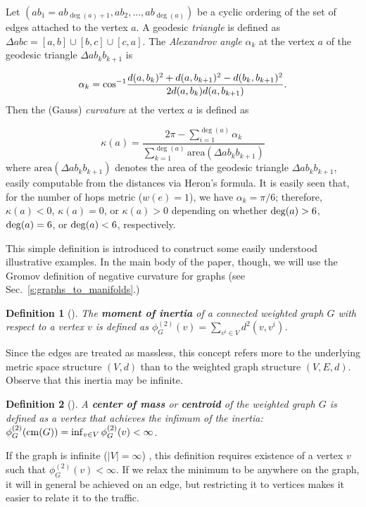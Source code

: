 \documentclass{article}
\newcommand{\area}{\mathrm{area}}
\newtheorem{definition}{Definition}
\begin{document}
Let $(ab_{1} =ab_{\deg (a)+1} ,ab_{2} ,...,ab_{\deg (a)} )$ be a cyclic ordering of the set of edges attached to the vertex $a$. A geodesic \textit{triangle} is defined as $\Delta abc=[a,b]\cup [b,c]\cup [c,a]$. The \textit{Alexandrov angle} $\alpha _{k} $ at the vertex $a$ of the geodesic triangle $\Delta ab_{k} b_{k+1} $ is

\[\alpha _{k} ={\rm cos}^{-1} \frac{d(a,b_{k} )^{2} +d(a,b_{k+1} )^{2} -d(b_{k} ,b_{k+1} )^{2} }{2d(a,b_{k} )d(a,b_{k+1} )} . \] 
Then the (Gauss) \textit{curvature} at the vertex $a$  is defined as 

\[\kappa (a)=\frac{2\pi -\sum _{i=1}^{\deg (a)}\alpha _{k}  }{\sum _{k=1}^{\deg (a)}\area(\Delta ab_{k} b_{k+1} ) } \] 
where $\area(\Delta ab_{k} b_{k+1} )$ denotes the area of the geodesic triangle $\Delta ab_{k} b_{k+1}$, 
easily computable from the distances via Heron's formula. It is easily seen that, for the number of hops metric ($w(e)=1$), 
we have $\alpha _{k} =\pi /6$; therefore, $\kappa (a)<0$,  $\kappa (a)=0$, or $\kappa (a)>0$ depending on whether ${\rm deg}(a)>6$, ${\rm deg}(a)=6$, or ${\rm deg}(a)<6$, respectively. 

This simple definition is introduced to construct some easily understood illustrative examples. 
In the main body of the paper, though, 
we will use the Gromov definition of negative curvature for graphs   
(see Sec.~\ref{s:graphs_to_manifolds}.)

\begin{definition}[\cite{Jost1997}]
\label{d:inertia}
The \textit{\textbf{moment of inertia}} of a connected weighted graph $G$ 
with respect to a vertex $v$ is defined as 
$\phi^{(2)}_{G} (v)=\sum _{v^{i} \in V}d^{2} (v,v^{i} )$. 
\end{definition}

\noindent
Since the edges are treated as massless, this concept refers more to the underlying metric space structure $(V,d)$ 
than to the weighted graph structure $(V,E,d)$. 
Observe that this inertia may be infinite. 

\begin{definition}[\cite{Jost1997}]
\label{d:center_of_mass}
A \textit{\textbf{center of mass}} or \textit{\textbf{centroid}} of the weighted graph $G$ is defined as a vertex 
that achieves the infimum of the inertia: $\phi_G^{(2)}({\rm cm}(G))=\inf_{v\in V} \phi^{(2)}_{G} (v)<\infty$. 
\end{definition}
\noindent
If the graph is infinite ($|V|=\infty$) , this definition requires existence 
of a vertex $v$ such that $\phi_G^{(2)}(v)<\infty$. If we relax the minimum to be anywhere on the graph, 
it will in general be achieved on an edge, but restricting it to vertices makes it easier to relate it to the traffic. 
\end{document}
